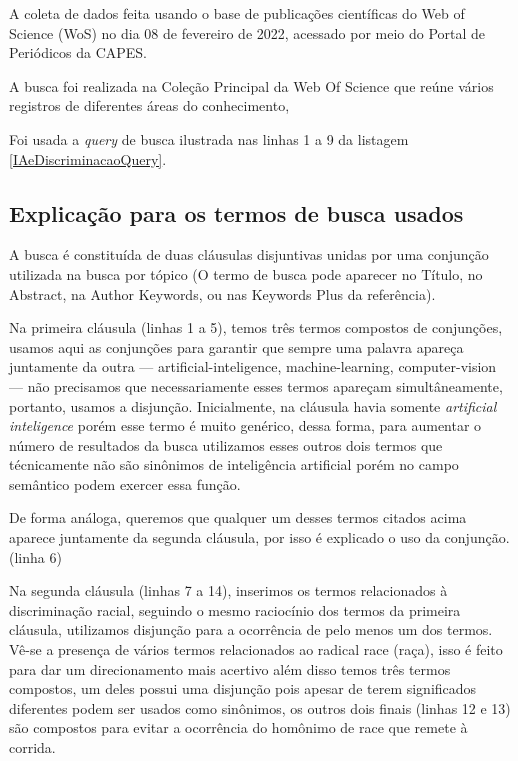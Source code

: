 A coleta de dados feita usando o base de publicações científicas do Web of Science (WoS) no dia 08 de fevereiro de 2022, acessado por meio do Portal de Periódicos da CAPES.

A busca foi realizada na Coleção Principal da Web Of Science que reúne vários registros de diferentes áreas do conhecimento,

Foi usada a \textit{query} de busca ilustrada nas linhas 1 a 9 da listagem \ref{IAeDiscriminacaoQuery}.



\subsection{Explicação para os termos de busca usados}
A busca é constituída de duas cláusulas disjuntivas unidas por uma conjunção utilizada na busca por tópico (O termo de busca pode aparecer no Título, no Abstract, na Author Keywords, ou nas Keywords Plus da referência).

Na primeira cláusula (linhas 1 a 5), temos três termos compostos de conjunções, usamos aqui as conjunções para garantir que sempre uma palavra apareça juntamente da outra --- artificial-inteligence, machine-learning, computer-vision --- não precisamos que necessariamente esses termos apareçam simultâneamente, portanto, usamos a disjunção. Inicialmente, na cláusula havia somente \textit{artificial inteligence} porém esse termo é muito genérico, dessa forma, para aumentar o número de resultados da busca utilizamos esses outros dois termos que técnicamente não são sinônimos de inteligência artificial porém no campo semântico podem exercer essa função.

De forma análoga, queremos que qualquer um desses termos citados acima aparece juntamente da segunda cláusula, por isso é explicado o uso da conjunção. (linha 6)

Na segunda cláusula (linhas 7 a 14), inserimos os termos relacionados à discriminação racial, seguindo o mesmo raciocínio dos termos da primeira cláusula, utilizamos disjunção para a ocorrência de pelo menos um dos termos. Vê-se a presença de vários termos relacionados ao radical race (raça), isso é feito para dar um direcionamento mais acertivo além disso temos três termos compostos, um deles possui uma disjunção pois apesar de terem significados diferentes podem ser usados como sinônimos, os outros dois finais (linhas 12 e 13) são compostos para evitar a ocorrência do homônimo de race que remete à corrida.

